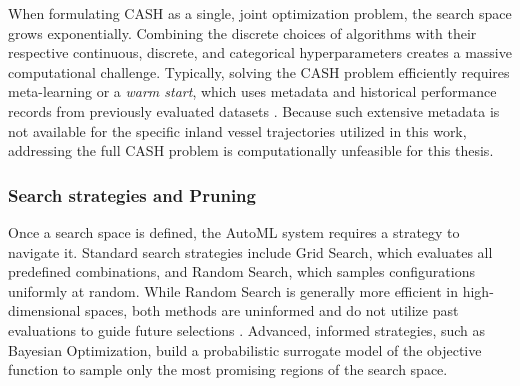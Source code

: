 When formulating \ac{CASH} as a single, joint optimization problem, the search space grows exponentially. Combining the discrete choices of algorithms with their respective continuous, discrete, and categorical hyperparameters creates a massive computational challenge. Typically, solving the \ac{CASH} problem efficiently requires meta-learning or a \emph{warm start}, which uses metadata and historical performance records from previously evaluated datasets \parencite{AutoMLHoos}. Because such extensive metadata is not available for the specific inland vessel trajectories utilized in this work, addressing the full \ac{CASH} problem is computationally unfeasible for this thesis. %

\subsubsection{Search strategies and Pruning}
Once a search space is defined, the \ac{AutoML} system requires a strategy to navigate it. Standard search strategies include Grid Search, which evaluates all predefined combinations, and Random Search, which samples configurations uniformly at random. While Random Search is generally more efficient in high-dimensional spaces,%
both methods are uninformed and do not utilize past evaluations to guide future selections \parencite{hutter2019automated}. Advanced, informed strategies, such as Bayesian Optimization, build a probabilistic surrogate model of the objective function to sample only the most promising regions of the search space. 


